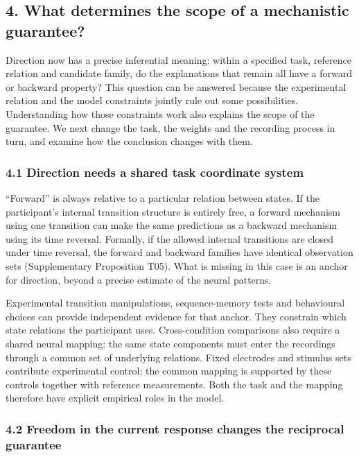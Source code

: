 \documentclass[11pt,a4paper]{article}
\begin{document}
\subsection{4. What determines the scope of a mechanistic
guarantee?}\label{what-determines-the-scope-of-a-mechanistic-guarantee}

Direction now has a precise inferential meaning: within a specified
task, reference relation and candidate family, do the explanations that
remain all have a forward or backward property? This question can be
answered because the experimental relation and the model constraints
jointly rule out some possibilities. Understanding how those constraints
work also explains the scope of the guarantee. We next change the task,
the weights and the recording process in turn, and examine how the
conclusion changes with them.

\subsubsection{4.1 Direction needs a shared task coordinate
system}\label{direction-needs-a-shared-task-coordinate-system}

“Forward” is always relative to a particular relation between states.
If the participant's internal transition structure is entirely free, a
forward mechanism using one transition can make the same predictions as
a backward mechanism using its time reversal. Formally, if the allowed
internal transitions are closed under time reversal, the forward and
backward families have identical observation sets (Supplementary
Proposition T05). What is missing in this case is an anchor for
direction, beyond a precise estimate of the neural patterns.

Experimental transition manipulations, sequence-memory tests and
behavioural choices can provide independent evidence for that anchor.
They constrain which state relations the participant uses.
Cross-condition comparisons also require a shared neural mapping: the
same state components must enter the recordings through a common set of
underlying relations. Fixed electrodes and stimulus sets contribute
experimental control; the common mapping is supported by these controls
together with reference measurements. Both the task and the mapping
therefore have explicit empirical roles in the model.

\subsubsection{4.2 Freedom in the current response changes the
reciprocal
guarantee}\label{freedom-in-the-current-response-changes-the-reciprocal-guarantee}
\end{document}
